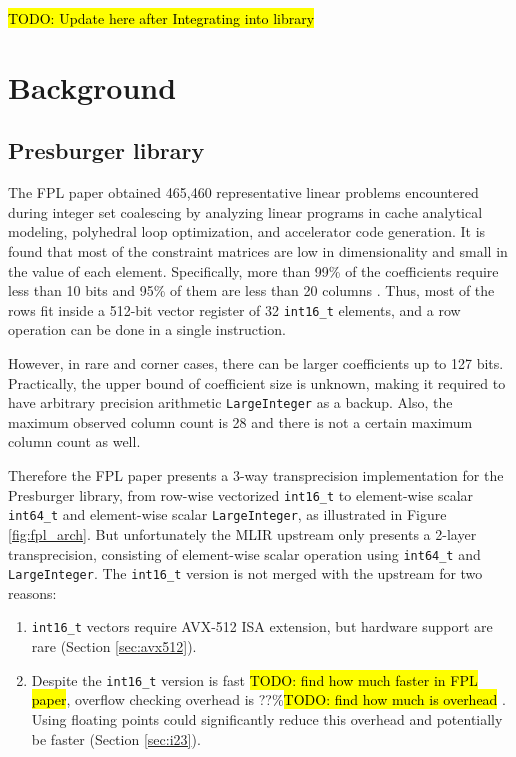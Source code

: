 \documentclass[logo,bsc,singlespacing,parskip]{infthesis}
\newenvironment{compactlist}
{ \begin{enumerate}
    \setlength{\itemsep}{0pt}
    \setlength{\parskip}{0pt}
    \setlength{\parsep}{0pt}     
}
{ \end{enumerate} }
\begin{document}
\hl{TODO: Update here after Integrating into library}



\chapter{Background}
\section{Presburger library}

The FPL paper obtained 465,460 representative linear problems encountered during
integer set coalescing by analyzing linear programs in cache analytical
modeling, polyhedral loop optimization, and accelerator code generation. It is
found that most of the constraint matrices are low in dimensionality and small
in the value of each element. Specifically, more than 99\% of the coefficients
require less than 10 bits and 95\% of them are less than 20 columns \cite{FPL1}.
Thus, most of the rows fit inside a 512-bit vector register of 32
\texttt{int16\_t} elements, and a row operation can be done in a single
instruction. 

However, in rare and corner cases, there can be larger coefficients up to 127
bits. Practically, the upper bound of coefficient size is unknown, making it
required to have arbitrary precision arithmetic \texttt{LargeInteger} as a
backup. Also, the maximum observed column count is 28 and there is not a certain
maximum column count as well. 

Therefore the FPL paper presents a 3-way transprecision implementation for the
Presburger library, from row-wise vectorized \texttt{int16\_t} to element-wise
scalar \texttt{int64\_t} and element-wise scalar \texttt{LargeInteger}, as
illustrated in Figure \ref{fig:fpl_arch}. But unfortunately the MLIR upstream
only presents a 2-layer transprecision, consisting of element-wise scalar
operation using \texttt{int64\_t} and \texttt{LargeInteger}. The
\texttt{int16\_t} version is not merged with the upstream for two reasons: 
\begin{compactlist} 
    \item \texttt{int16\_t} vectors require AVX-512 ISA extension, but hardware
    support are rare (Section \ref{sec:avx512}). 
    \item Despite the \texttt{int16\_t} version is fast \hl{TODO: find how much
    faster in FPL paper}, overflow checking overhead is ??\%\hl{TODO: find how
    much is overhead} \cite{FPL2}. Using floating points could significantly
    reduce this overhead and potentially be faster (Section \ref{sec:i23}).  
\end{compactlist}
\end{document}
